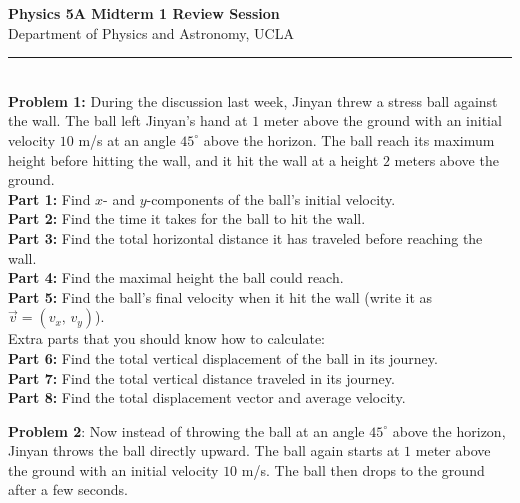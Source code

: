 \documentclass[11pt]{article}
\begin{document}
\Large \noindent \textbf{Physics 5A Midterm 1 Review Session}\\
\normalsize
Department of Physics and Astronomy, UCLA\\
\noindent\rule{8cm}{0.4pt}\\

\textbf{Problem 1:} During the discussion last week, Jinyan threw a stress ball against the wall. The ball left Jinyan's hand at $1$ meter above the ground with an initial velocity $10$ m/s at an angle $45^\circ$ above the horizon. The ball reach its maximum height before hitting the wall, and it hit the wall at a height $2$ meters above the ground.\\

\noindent\textbf{Part 1:} Find $x$- and $y$-components of the ball's initial velocity.\\
\textbf{Part 2:} Find the time it takes for the ball to hit the wall. \\
\textbf{Part 3:} Find the total horizontal distance it has traveled before reaching the wall.\\
\textbf{Part 4:} Find the maximal height the ball could reach.\\
\textbf{Part 5:} Find the ball's final velocity when it hit the wall (write it as $\vec{v} = (v_x,\,v_y)$).\\

\noindent Extra parts that you should know how to calculate:\\
\textbf{Part 6:} Find the total vertical displacement of the ball in its journey.\\
\textbf{Part 7:} Find the total vertical distance traveled in its journey.\\
\textbf{Part 8:} Find the total displacement vector and average velocity. 

\hfill\newline\hfill\newline\hfill\newline
\hfill\newline\hfill\newline\hfill\newline
\hfill\newline\hfill\newline\hfill\newline

\textbf{Problem 2}: Now instead of throwing the ball at an angle $45^\circ$ above the horizon, Jinyan throws the ball directly upward. The ball again starts at $1$ meter above the ground with an initial velocity $10$ m/s. The ball then drops to the ground after a few seconds. \\
\end{document}
